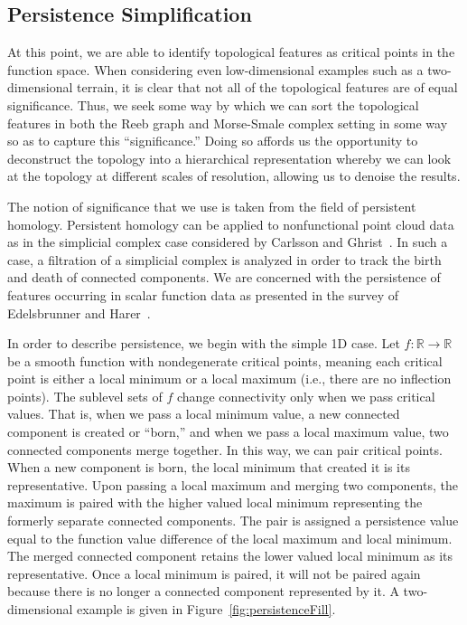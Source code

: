 \subsection{Persistence Simplification}
At this point, we are able to identify topological features as critical points in the function space.
%
When considering even low-dimensional examples such as a two-dimensional terrain, it is clear that not all of the topological features are of equal significance.
%
Thus, we seek some way by which we can sort the topological features in both the Reeb graph and  Morse-Smale complex setting in some way so as to capture this ``significance.''
%
Doing so affords us the opportunity to deconstruct the topology into a hierarchical representation whereby we can look at the topology at different scales of resolution, allowing us to denoise the results.

The notion of significance that we use is taken from the field of persistent homology.
%
Persistent homology can be applied to nonfunctional point cloud data as in the simplicial complex case considered by Carlsson and Ghrist~\cite{Carlsson2009,Ghrist2009}.
%
In such a case, a filtration of a simplicial complex is analyzed in order to track the birth and death of connected components.
%
We are concerned with the persistence of features occurring in scalar function data as presented in the survey of Edelsbrunner and Harer~\cite{EdelsbrunnerHarer2008}.

In order to describe persistence, we begin with the simple 1D case.
%
Let $f: \mathbb{R} \rightarrow \mathbb{R}$ be a smooth function with nondegenerate critical points, meaning each critical point is either a local minimum or a local maximum (i.e., there are no inflection points).
%
The sublevel sets of $f$ change connectivity only when we pass critical values.
%
That is, when we pass a local minimum value, a new connected component is created or ``born,'' and when we pass a local maximum value, two connected components merge together.
%
In this way, we can pair critical points.
%
When a new component is born, the local minimum that created it is its representative.
%
Upon passing a local maximum and merging two components, the maximum is paired with the higher valued local minimum representing the formerly separate connected components.
%
The pair is assigned a persistence value equal to the function value difference of the local maximum and local minimum.
%
The merged connected component retains the lower valued local minimum as its representative.
%
Once a local minimum is paired, it will not be paired again because there is no longer a connected component represented by it.
%
A two-dimensional example is given in Figure~\ref{fig:persistenceFill}.

